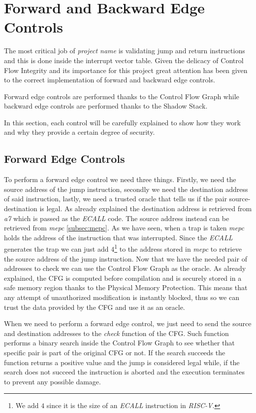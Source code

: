 \section{Forward and Backward Edge Controls}
\label{sec:project_controls}

The most critical job of \textit{project name} is validating jump and return
instructions and this is done inside the interrupt vector table. Given the delicacy
of Control Flow Integrity and its importance for this project great attention has
been given to the correct implementation of forward and backward edge controls.

Forward edge controls are performed thanks to the Control Flow Graph while backward
edge controls are performed thanks to the Shadow Stack.

In this section, each control will be carefully explained to show how they work
and why they provide a certain degree of security.

\subsection{Forward Edge Controls}
\label{subsec:forward}

To perform a forward edge control we need three things. Firstly, we need the source
address of the jump instruction, secondly we need the destination address of
said instruction, lastly, we need a trusted oracle that tells us if the pair
source-destination is legal. As already explained the destination address is retrieved
from \textit{a7} which is passed as the \textit{ECALL} code. The source address
instead can be retrieved from \textit{mepc} \ref{subsec:mepc}. As we have seen, when
a trap is taken \textit{mepc} holds the address of the instruction that was
interrupted. Since the \textit{ECALL} generates the trap we can just add $4$\footnote{We
add $4$ since it is the size of an \textit{ECALL} instruction in \textit{RISC-V}.}
to the address stored in \textit{mepc} to retrieve the source address of the
jump instruction. Now that we have the needed pair of addresses to check we can use
the Control Flow Graph as the oracle. As already explained, the CFG is computed before
compilation and is securely stored in a safe memory region thanks to the Physical
Memory Protection. This means that any attempt of unauthorized modification is
instantly blocked, thus so we can trust the data provided by the CFG and use it as
an oracle.

When we need to perform a forward edge control, we just need to send the source
and destination addresses to the \textit{check} function of the CFG. Such
function performs a binary search inside the Control Flow Graph to see whether
that specific pair is part of the original CFG or not. If the search succeeds the
function returns a positive value and the jump is considered legal while, if the
search does not succeed the instruction is aborted and the execution terminates
to prevent any possible damage.

